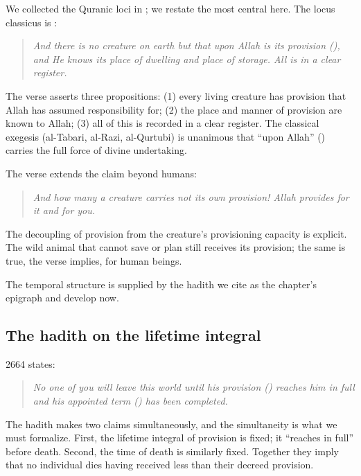 We collected the Quranic loci in ; we restate the
most central here. The locus classicus is :

\begin{quote}
\textit{And there is no creature on earth but that upon Allah is its
provision (), and He knows its place of dwelling and
place of storage. All is in a clear register.}
\end{quote}

The verse asserts three propositions: (1) every living creature has
provision that Allah has assumed responsibility for; (2) the place
and manner of provision are known to Allah; (3) all of this is
recorded in a clear register. The classical exegesis (al-Tabari,
al-Razi, al-Qurtubi) is unanimous that ``upon Allah''
() carries the full force of divine undertaking.

The verse  extends the claim beyond humans:

\begin{quote}
\textit{And how many a creature carries not its own provision!
Allah provides for it and for you.}
\end{quote}

The decoupling of provision from the creature's provisioning capacity
is explicit. The wild animal that cannot save or plan still receives
its provision; the same is true, the verse implies, for human beings.

The temporal structure is supplied by the hadith we cite as the
chapter's epigraph and develop now.

\subsection{The hadith on the lifetime integral}

 2664 states:

\begin{quote}
\textit{No one of you will leave this world until his provision
() reaches him in full and his appointed term
() has been completed.}
\end{quote}

The hadith makes two claims simultaneously, and the simultaneity is
what we must formalize. First, the lifetime integral of provision is
fixed; it ``reaches in full'' before death. Second, the time of death
is similarly fixed. Together they imply that no individual dies
having received less than their decreed provision.

